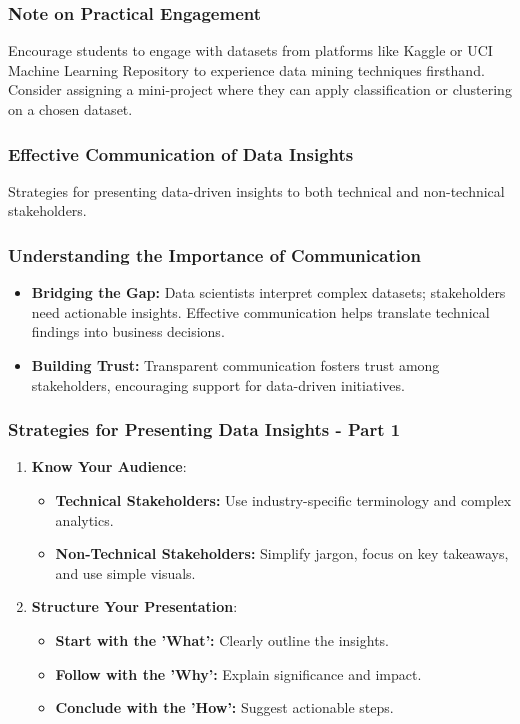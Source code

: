 \documentclass{beamer}
\begin{document}
\begin{frame}[fragile]
    \frametitle{Note on Practical Engagement}
    Encourage students to engage with datasets from platforms like Kaggle or UCI Machine Learning Repository to experience data mining techniques firsthand. 
    Consider assigning a mini-project where they can apply classification or clustering on a chosen dataset.
\end{frame}

\begin{frame}[fragile]
    \frametitle{Effective Communication of Data Insights}
    Strategies for presenting data-driven insights to both technical and non-technical stakeholders.
\end{frame}

\begin{frame}[fragile]
    \frametitle{Understanding the Importance of Communication}
    \begin{itemize}
        \item \textbf{Bridging the Gap:} 
        Data scientists interpret complex datasets; stakeholders need actionable insights. Effective communication helps translate technical findings into business decisions.
        
        \item \textbf{Building Trust:} 
        Transparent communication fosters trust among stakeholders, encouraging support for data-driven initiatives.
    \end{itemize}
\end{frame}

\begin{frame}[fragile]
    \frametitle{Strategies for Presenting Data Insights - Part 1}
    \begin{enumerate}
        \item \textbf{Know Your Audience}:
        \begin{itemize}
            \item \textbf{Technical Stakeholders:} Use industry-specific terminology and complex analytics.
            \item \textbf{Non-Technical Stakeholders:} Simplify jargon, focus on key takeaways, and use simple visuals.
        \end{itemize}
        \item \textbf{Structure Your Presentation}:
        \begin{itemize}
            \item \textbf{Start with the 'What':} Clearly outline the insights.
            \item \textbf{Follow with the 'Why':} Explain significance and impact.
            \item \textbf{Conclude with the 'How':} Suggest actionable steps.
        \end{itemize}
    \end{enumerate}
\end{frame}
\end{document}
